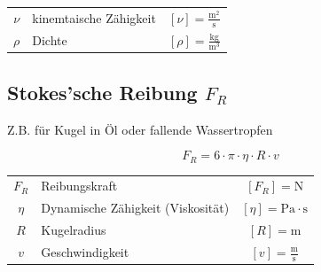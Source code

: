 \begin{tabular}{c l c}
		\rule{0pt}{8pt}$\nu$ & kinemtaische Zähigkeit & $[\nu] = \mathrm{\frac{m^2}{s}}$ \\
		\rule{0pt}{8pt}$\rho$ & Dichte & $[\rho] = \mathrm{\frac{kg}{m^3}}$  \\	
\end{tabular}
	

	
\subsection{Stokes'sche Reibung $F_R$}
Z.B. für Kugel in Öl oder fallende Wassertropfen

$$ \boxed{ F_R = 6 \cdot \pi \cdot \eta \cdot R \cdot v } $$

\begin{tabular}{c l c}
		$F_R$ & Reibungskraft & $[F_R] = \mathrm{N}$ \\
		$\eta$ & Dynamische Zähigkeit (Viskosität) & $[\eta] = \mathrm{Pa \cdot s}$  \\
		$R$ & Kugelradius & $[R] = \mathrm{m}$ \\
		\rule{0pt}{8pt}$v$ & Geschwindigkeit & $[v] = \mathrm{\frac{m}{s}}$		
\end{tabular}


